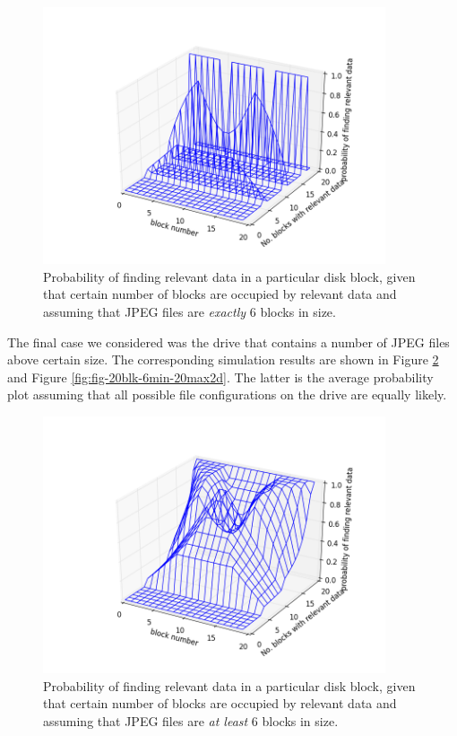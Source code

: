 \documentclass[final,5p,times,twocolumn,authoryear]{elsarticle}
\begin{document}
\begin{figure}
  \centerline{\includegraphics[width=0.9\textwidth]{figures/fig-20blk-6min-6max3d}}
  \caption{Probability of finding relevant data in a particular disk block, given that certain number of blocks are occupied by relevant data and assuming that JPEG files are \emph{exactly} 6 blocks in size.}
  \label{fig:fig-20blk-6min-6max3d}
\end{figure}

The final case we considered was the drive that contains a number of JPEG files above certain size. The corresponding simulation results are shown in Figure \ref{fig:fig-20blk-6min-20max3d} and Figure \ref{fig:fig-20blk-6min-20max2d}. The latter is the average probability plot assuming that all possible file configurations on the drive are equally likely. 

\begin{figure}
  \centerline{\includegraphics[width=0.9\textwidth]{figures/fig-20blk-6min-20max3d}}
  \caption{Probability of finding relevant data in a particular disk block, given that certain number of blocks are occupied by relevant data and assuming that JPEG files are \emph{at least} 6 blocks in size.}
  \label{fig:fig-20blk-6min-20max3d}
\end{figure}
\end{document}
